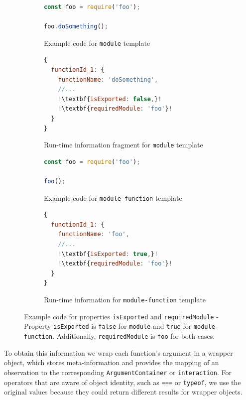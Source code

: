 \documentclass[sigplan,screen]{acmart}
\begin{document}
\begin{figure}[t]
  \begin{subfigure}[t]{0.48\linewidth}
    \begin{lstlisting}[language=JavaScript,numbers=none]
const foo = require('foo');

foo.doSomething();
    \end{lstlisting}
  \caption{Example code for \texttt{module} template}
  \end{subfigure}
  \hfill
  \begin{subfigure}[t]{0.48\linewidth}
    \begin{lstlisting}[language=JavaScript,numbers=none,escapechar=!]
{
  functionId_1: {
    functionName: 'doSomething',
    //...
    !\textbf{isExported: false,}!
    !\textbf{requiredModule: 'foo'}!
  }
}    
    \end{lstlisting}
    \caption{Run-time information fragment for \texttt{module} template}
  \end{subfigure}

  \begin{subfigure}[t]{0.48\linewidth}
    \begin{lstlisting}[language=JavaScript,numbers=none]
const foo = require('foo');

foo();
    \end{lstlisting}
    \caption{Example code for \texttt{module-function} template}
  \end{subfigure}
  \hfill
  \begin{subfigure}[t]{0.48\linewidth}
    \begin{lstlisting}[language=JavaScript,numbers=none,escapechar=!]
{
  functionId_1: {
    functionName: 'foo',
    //...
    !\textbf{isExported: true,}!
    !\textbf{requiredModule: 'foo'}!
  }
}    
    \end{lstlisting}
    \caption{Run-time information for \texttt{module-function} template}
  \end{subfigure}
  \caption{Example code for properties \texttt{isExported} and \texttt{requiredModule} - Property \texttt{isExported} is
  \texttt{false} for \texttt{module} and \texttt{true} for \texttt{module-function}. Additionally, \texttt{requiredModule}
  is \texttt{foo} for both cases.
  }
  \label{fig:example-is-exported-required-module}
\end{figure}

To obtain this information we wrap each function's argument in a wrapper object, which stores meta-information and provides the mapping of an observation 
to the corresponding \texttt{ArgumentContainer} or
\texttt{interaction}. For operators that are aware of object identity, such as 
\texttt{===} or \texttt{typeof}, we use the original values because
they could return different results for wrapper objects.
\end{document}
